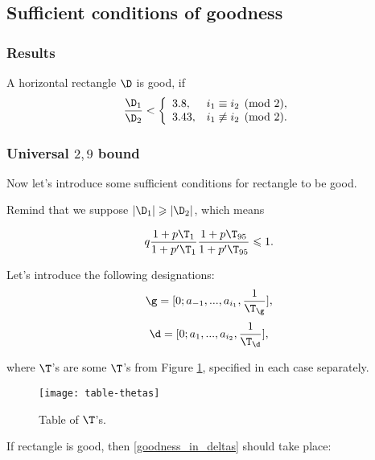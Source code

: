 \subsection{Sufficient conditions of goodness}

\subsubsection{Results}

A horizontal rectangle $\D$ is good, if
\begin{equation}\label{goodness_condition}
	\dfrac{\D_1}{\D_2} <
	\left\{\begin{array}{ll}
		3.8, & i_1 \equiv i_2 \pmod 2,\\
		3.43, & i_1 \not\equiv i_2 \pmod 2.
	\end{array}\right.
\end{equation}

\subsubsection{Universal $2,9$ bound}

Now let's introduce some sufficient conditions for rectangle to be good.


Remind that we suppose $|\D_1| \geqslant |\D_2|$, which means

\begin{equation*}
	q
	\dfrac{1 + p \T_{1}}{1 + p' \T_{1}}
	\dfrac{1 + p \T_{95}}{1 + p' \T_{95}} \leqslant 1.
\end{equation*}

Let's introduce the following designations:
\begin{equation*}
	\g = [0; a_{-1}, ..., a_{i_1}, \frac{1}{\T_\g}],
\end{equation*}
\begin{equation*}
	\d = [0; a_{1}, ..., a_{i_2}, \frac{1}{\T_\d}],
\end{equation*}

where $\T$'s are some $\T$'s from Figure \ref{table_theta},
specified in each case separately.

\begin{figure}[p]
	\texttt{[image: table-thetas]}
	\caption{Table of $\T$'s.}
	\label{table_theta}
\end{figure}

If rectangle is good, then \ref{goodness_in_deltas} should take place:

